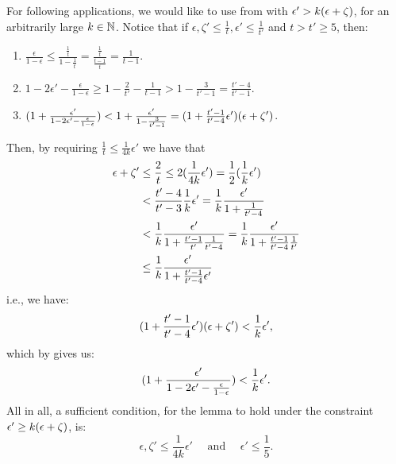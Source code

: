         \begin{remark} \label{rmk:value_for_even_partition_of_excellent_parts}
            For following applications, we would like to use  from
             with $\epsilon' > k ( \epsilon + \zeta )$, for an arbitrarily large $k \in \mathbb{N}$.
            Notice that if $\epsilon, \zeta' \leq \frac{1}{t}, \epsilon' \leq \frac{1}{t'}$ and $t > t' \geq 5$, then:
            \begin{enumerate}[label=(\alph*), ref=\alph*]
                \item $\frac{\epsilon}{1-\epsilon} \leq \frac{\frac{1}{t}}{1-\frac{1}{t}} = \frac{\frac{1}{t}}{\frac{t-1}{t}}
                    = \frac{1}{t-1}$.
                \item $1 - 2 \epsilon' - \frac{\epsilon}{1-\epsilon} \geq 1 - \frac{2}{t'} - \frac{1}{t-1} > 1 - \frac{3}{t'-1}
                    = \frac{t'-4}{t'-1}$.
                \item \label{itm:value_for_even_partition_of_excellent_parts.c} $( 1 + \frac{\epsilon'}{1 - 2 \epsilon' - \frac{\epsilon}{1-\epsilon}} )
                    < 1 + \frac{\epsilon'}{1 - \frac{3}{t'-1}}
                    = ( 1 + \frac{t'-1}{t'-4} \epsilon' ) ( \epsilon + \zeta' )$.
            \end{enumerate}
            Then, by requiring $\frac{1}{t} \leq \frac{1}{4k}\epsilon'$ we have that
            \begin{align*}
                \epsilon + \zeta'
                    & \leq \frac{2}{t} \leq 2 ( \frac{1}{4k}\epsilon' ) = \frac{1}{2} ( \frac{1}{k}\epsilon' ) \\
                    & < \frac{t'-4}{t'- 3} \frac{1}{k} \epsilon' = \frac{1}{k} \frac{\epsilon'}{1 + \frac{1}{t'-4}} \\
                    & < \frac{1}{k} \frac{\epsilon'}{1 + \frac{t'-1}{t'}\frac{1}{t'-4}} = \frac{1}{k} \frac{\epsilon'}{1 + \frac{t'-1}{t'-4}\frac{1}{t'}} \\
                    & \leq \frac{1}{k} \frac{\epsilon'}{1 + \frac{t'-1}{t'-4}\epsilon'}
            \end{align*}
            i.e., we have:
            \[
                ( 1 + \frac{t'-1}{t'-4} \epsilon' ) ( \epsilon + \zeta' ) < \frac{1}{k} \epsilon',
            \]
            which by  gives us:
            \[
                ( 1 + \frac{\epsilon'}{1 - 2 \epsilon' - \frac{\epsilon}{1-\epsilon}} ) < \frac{1}{k} \epsilon'.
            \]
            All in all, a sufficient condition, for the lemma to hold under the constraint $\epsilon' \geq k ( \epsilon + \zeta )$, is:
            \[
                \epsilon, \zeta' \leq \frac{1}{4k} \epsilon' \quad \text{ and } \quad \epsilon' \leq \frac{1}{5}.
            \]
        \end{remark}


